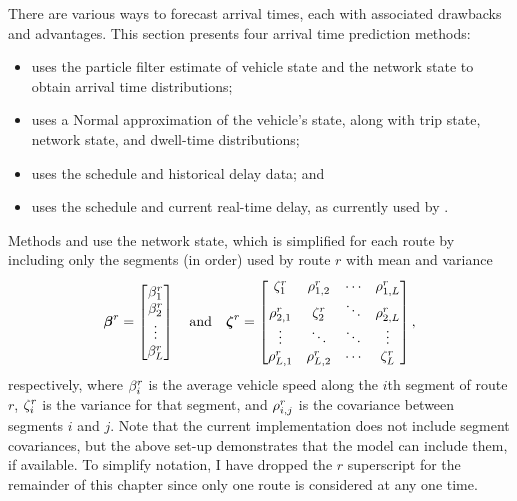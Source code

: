 There are various ways to forecast arrival times, each with associated drawbacks and advantages. This section presents four arrival time prediction methods:
\begin{itemize}
\item \Fpf{} uses the particle filter estimate of vehicle state and the network state to obtain arrival time distributions;
\item \Fnorm{} uses a Normal approximation of the vehicle's state, along with trip state, network state, and dwell-time distributions;
\item \Fhist{} uses the schedule and historical delay data; and
\item \Fsched{} uses the schedule and current real-time delay, as currently used by \AT{}.
\end{itemize}


Methods \Fpf{} and \Fnorm{} use the network state, which is simplified for each route by including only the segments (in order) used by route $r$ with mean and variance
\begin{equation}
\label{eq:route_nw_state}
\boldsymbol\beta^r =
\begin{bmatrix}
\beta^r_1 \\
\beta^r_2 \\
\vdots \\
\beta^r_L
\end{bmatrix}\quad\text{and}\quad
\boldsymbol{\zeta}^r =
\begin{bmatrix}
\zeta^r_{1} & \rho^r_{1,2} & \cdots &\rho^r_{1,L} \\
\rho^r_{2,1} & \zeta^r_{2} & \ddots &\rho^r_{2,L} \\
\vdots & \ddots & \ddots & \vdots \\
\rho^r_{L,1} & \rho^r_{L,2} & \cdots & \zeta^r_L
\end{bmatrix},
\end{equation}
respectively, where $\beta^r_{i}$ is the average vehicle speed along the $i$th segment of route $r$, $\zeta^r_{i}$ is the variance for that segment, and $\rho^r_{i,j}$ is the covariance between segments $i$ and $j$. Note that the current implementation does not include segment covariances, but the above set-up demonstrates that the model can include them, if available. To simplify notation, I have dropped the $r$ superscript for the remainder of this chapter since only one route is considered at any one time.

